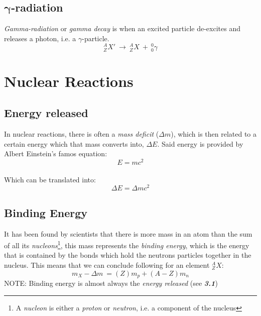 \documentclass[12pt]{article}
\begin{document}
\subsection{$\bm{\gamma}$-radiation}

\emph{Gamma-radiation} or \emph{gamma decay} is when an 
excited particle de-excites and releases a photon, i.e. a $\gamma$-particle.
$$^{A}_{Z}X' \ \rightarrow \ ^{A}_{Z}X \ + \ ^0_0\gamma$$



\section{Nuclear Reactions}

\subsection{Energy released}

In nuclear reactions, there is often a \emph{mass deficit} ($\Delta m$), which is then related to a certain energy which that mass converts into, $\Delta E$. Said energy is provided by Albert Einstein's famos equation: $$E = mc^2$$ \\
Which can be translated into: $$\Delta E = \Delta mc^2$$

\subsection{Binding Energy}
It has been found by scientists that there is more mass in an atom than the sum of all its \emph{nucleons}\footnote{A \emph{nucleon} is either a \emph{proton} or \emph{neutron}, i.e. a component of the nucleus}, this mass represents the \emph{binding energy}, which is the energy that is contained by the bonds which hold the neutrons particles together in the nucleus. This means that we can conclude following for an element $^{A}_{Z}X$: $$m_X - \Delta m \ = (Z)m_p + (A-Z)m_n$$
\bigbreak
NOTE: Binding energy is almost always the \emph{energy released} (see \textbf{\emph{3.1}})

\newpage
\end{document}
